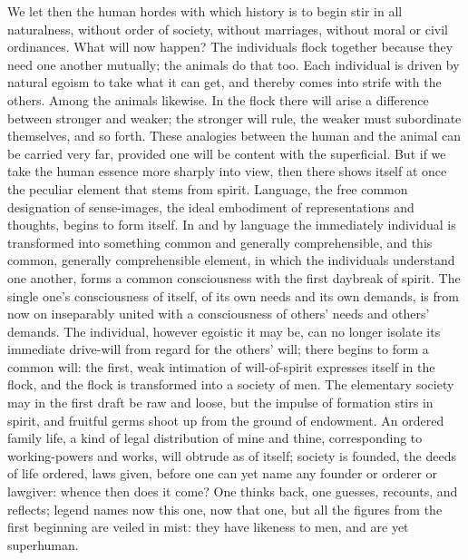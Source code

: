 \documentclass[12pt]{book}
\begin{document}
We let then the human hordes with which history is to begin stir in all naturalness, without
order of society, without marriages, without moral or civil ordinances. What will now happen?
The individuals flock together because they need one another mutually; the animals do that too.
Each individual is driven by natural egoism to take what it can get, and thereby comes into
strife with the others. Among the animals likewise. In the flock there will arise a difference
between stronger and weaker; the stronger will rule, the weaker must subordinate themselves, and
so forth. These analogies between the human and the animal can be carried very far, provided one
will be content with the superficial. But if we take the human essence more sharply into view,
then there shows itself at once the peculiar element that stems from spirit. Language, the free
common designation of sense-images, the ideal embodiment of representations and thoughts, begins
to form itself. In and by language the immediately individual is transformed into something
common and generally comprehensible, and this common, generally comprehensible element, in which
the individuals understand one another, forms a common consciousness with the first daybreak of
spirit. The single one's consciousness of itself, of its own needs and its own demands, is from
now on inseparably united with a consciousness of others' needs and others' demands. The
individual, however egoistic it may be, can no longer isolate its immediate drive-will from
regard for the others' will; there begins to form a common will: the first, weak intimation of
will-of-spirit expresses itself in the flock, and the flock is transformed into a society of men.
The elementary society may in the first draft be raw and loose, but the impulse of formation
stirs in spirit, and fruitful germs shoot up from the ground of endowment. An ordered family
life, a kind of legal distribution of mine and thine, corresponding to working-powers and works,
will obtrude as of itself; society is founded, the deeds of life ordered, laws given, before one
can yet name any founder or orderer or lawgiver: whence then does it come? One thinks back, one
guesses, recounts, and reflects; legend names now this one, now that one, but all the figures from
the first beginning are veiled in mist: they have likeness to men, and are yet superhuman.
\end{document}
